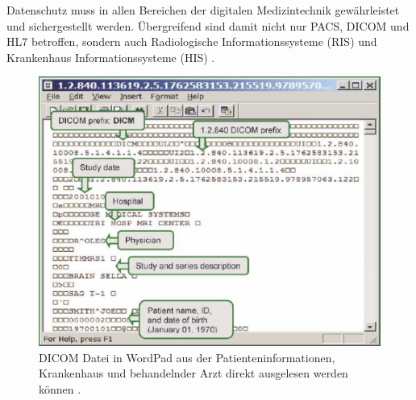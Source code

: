 Datenschutz muss in allen Bereichen der digitalen Medizintechnik gewährleistet und sichergestellt werden. Übergreifend sind damit nicht nur PACS, DICOM und HL7 betroffen, sondern auch Radiologische Informationssysteme (RIS) und Krankenhaus Informationssysteme (HIS) \cite{DICOM}. 

\begin{figure} [t!]
	\includegraphics[scale = 0.7]{Content/Pictures/DICOMEditor.png}
	\caption{DICOM Datei in WordPad aus der Patienteninformationen, Krankenhaus und behandelnder Arzt direkt ausgelesen werden können \cite{DICOM}.}
	\label{fig:dicom}
\end{figure}
